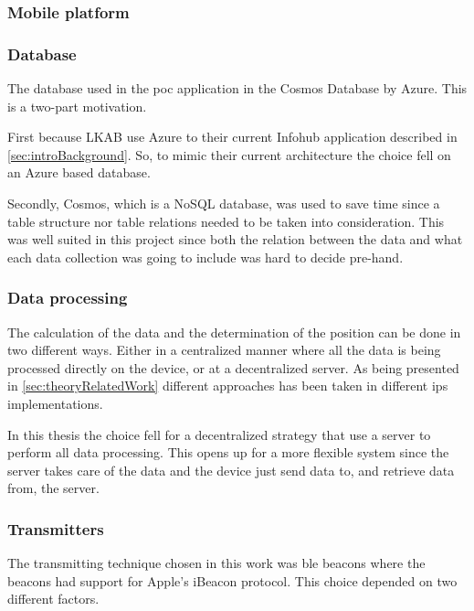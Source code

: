 \subsubsection{Mobile platform}\label{sec:methodSoftwareDesignMobilePlatform}


\subsubsection{Database}\label{sec:methodSoftwareDesignDatabase}
The database used in the \acrshort{poc} application in the Cosmos Database by Azure.
This is a two-part motivation.

\bigskip

First because LKAB use Azure to their current Infohub application described in \cref{sec:introBackground}.
So, to mimic their current architecture the choice fell on an Azure based database.

\bigskip

Secondly, Cosmos, which is a NoSQL database, was used to save time since a table structure nor table relations needed to be taken into consideration.
This was well suited in this project since both the relation between the data and what each data collection was going to include was hard to decide pre-hand.


\subsubsection{Data processing}\label{sec:methodSoftwareDesignData}
The calculation of the data and the determination of the position can be done in two different ways.
Either in a centralized manner where all the data is being processed directly on the device, or at a decentralized server.
As being presented in \cref{sec:theoryRelatedWork} different approaches has been taken in different \acrshort{ips} implementations.

\bigskip

In this thesis the choice fell for a decentralized strategy that use a server to perform all data processing.
This opens up for a more flexible system since the server takes care of the data and the device just send data to, and retrieve data from, the server.


\subsubsection{Transmitters}\label{sec:methodSoftwareDesignTransmitters}
The transmitting technique chosen in this work was \acrfull{ble} beacons where the beacons had support for Apple's iBeacon protocol.
This choice depended on two different factors.


